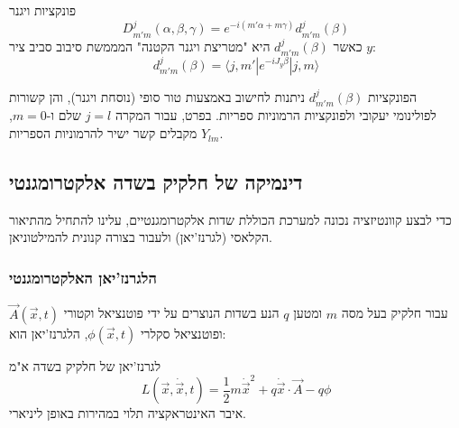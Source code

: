 \begin{resultbox}{פונקציות ויגנר}
\begin{equation}
    D^j_{m'm}(\alpha, \beta, \gamma) = e^{-i(m'\alpha + m\gamma)} d^j_{m'm}(\beta)
\end{equation}
כאשר $d^j_{m'm}(\beta)$ היא "מטריצת ויגנר הקטנה" המממשת סיבוב סביב ציר $y$:
\begin{equation}
    d^j_{m'm}(\beta) = \langle j,m' | e^{-i J_y \beta} | j,m \rangle
\end{equation}
\end{resultbox}

הפונקציות $d^j_{m'm}(\beta)$ ניתנות לחישוב באמצעות טור סופי (נוסחת ויגנר), והן קשורות לפולינומי יעקובי ולפונקציות הרמוניות ספריות. בפרט, עבור המקרה $j=l$ שלם ו-$m=0$, מקבלים קשר ישיר להרמוניות הספריות $Y_{lm}$.

\subsection{דינמיקה של חלקיק בשדה אלקטרומגנטי}

כדי לבצע קוונטיזציה נכונה למערכת הכוללת שדות אלקטרומגנטיים, עלינו להתחיל מהתיאור הקלאסי (לגרנז'יאן) ולעבור בצורה קנונית להמילטוניאן.

\subsubsection{הלגרנז'יאן האלקטרומגנטי}
עבור חלקיק בעל מסה $m$ ומטען $q$ הנע בשדות הנוצרים על ידי פוטנציאל וקטורי $\vec{A}(\vec{x},t)$ ופוטנציאל סקלרי $\phi(\vec{x},t)$, הלגרנז'יאן הוא:
\begin{definitionbox}{לגרנז'יאן של חלקיק בשדה א"מ}
\begin{equation}
    L(\vec{x}, \dot{\vec{x}}, t) = \frac{1}{2}m\dot{\vec{x}}^2 + q \dot{\vec{x}} \cdot \vec{A} - q\phi
\end{equation}
איבר האינטראקציה תלוי במהירות באופן ליניארי.
\end{definitionbox}


